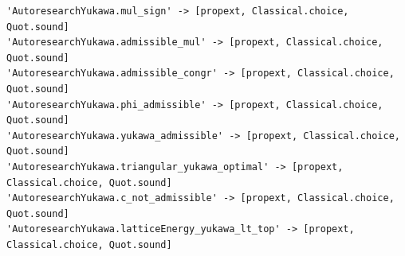 \begin{Verbatim}[fontsize=\scriptsize,frame=single,framesep=1.5mm]
'AutoresearchYukawa.mul_sign' -> [propext, Classical.choice, Quot.sound]
'AutoresearchYukawa.admissible_mul' -> [propext, Classical.choice, Quot.sound]
'AutoresearchYukawa.admissible_congr' -> [propext, Classical.choice, Quot.sound]
'AutoresearchYukawa.phi_admissible' -> [propext, Classical.choice, Quot.sound]
'AutoresearchYukawa.yukawa_admissible' -> [propext, Classical.choice, Quot.sound]
'AutoresearchYukawa.triangular_yukawa_optimal' -> [propext, Classical.choice, Quot.sound]
'AutoresearchYukawa.c_not_admissible' -> [propext, Classical.choice, Quot.sound]
'AutoresearchYukawa.latticeEnergy_yukawa_lt_top' -> [propext, Classical.choice, Quot.sound]
\end{Verbatim}
